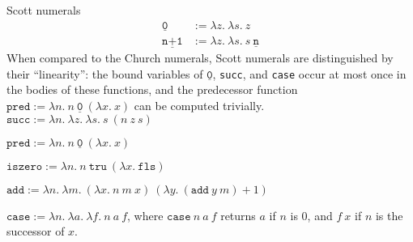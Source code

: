 \documentclass{article}
\theoremstyle{definition}
\newcommand{\fls}{\texttt{fls}\xspace}
\newcommand{\tru}{\texttt{tru}\xspace}
\renewcommand{\l}[1]{\lambda #1.~}
\newcommand{\snum}[1]{\underline{\texttt{#1}}}
\begin{document}
\newpage
Scott numerals
\begin{align*}
  \snum{0} &:= \l{z} \l{s} z \\
  \snum{n+1} &:= \l{z} \l{s} s~\snum{n}
\end{align*}
When compared to the Church numerals, Scott numerals are distinguished by
their ``linearity'': the bound variables of \(\snum{0}\), \texttt{succ}, and
\texttt{case} occur at most once in the bodies of these functions,
and the predecessor function \(\texttt{pred} := \l{n} n~\snum{0}~(\l{x} x)\)
can be computed trivially\cite{ACP93}.
\\

\(\mathtt{succ} := \l{n} \l{z} \l{s} s~(n~z~s)\)

\(\mathtt{pred} := \l{n} n~\snum{0}~(\l{x} x)\)

\(\mathtt{iszero} := \l{n} n~\tru~(\l{x} \fls)\)

\(\mathtt{add} := \l{n} \l{m} (\l{x} n~m~x)~(\l{y} (\mathtt{add}~y~m) + 1) \)

\(\mathtt{case} := \l{n} \l{a} \l{f} n~a~f\), where \(\mathtt{case}~n~a~f\)
returns \(a\) if \(n\) is 0, and \(f~x\) if \(n\) is the successor of \(x\).



\end{document}

